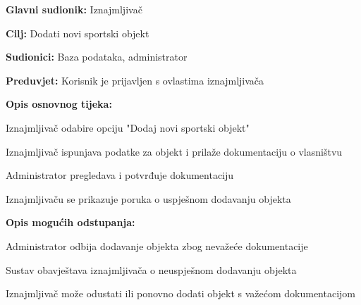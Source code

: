 					\noindent {}
					\begin{packed_item}
						
						\item \textbf{Glavni sudionik: } Iznajmljivač
						\item  \textbf{Cilj:} Dodati novi sportski objekt
						\item  \textbf{Sudionici:} Baza podataka, administrator
						\item  \textbf{Preduvjet:} Korisnik je prijavljen s ovlastima iznajmljivača 
						\item  \textbf{Opis osnovnog tijeka:}
						
						\item[] \begin{packed_enum}
							
							\item Iznajmljivač odabire opciju "Dodaj novi sportski objekt"
							\item Iznajmljivač ispunjava podatke za objekt i prilaže dokumentaciju o vlasništvu
							\item Administrator pregledava i potvrđuje dokumentaciju
							\item Iznajmljivaču se prikazuje poruka o uspješnom dodavanju objekta
							
						\end{packed_enum}
						
						\item  \textbf{Opis mogućih odstupanja:}
						
						\item[] \begin{packed_item}
							
							\item[3.a] Administrator odbija dodavanje objekta zbog nevažeće dokumentacije
							\item[] \begin{packed_enum}
								
								\item Sustav obavještava iznajmljivača o neuspješnom dodavanju objekta
								\item Iznajmljivač može odustati ili ponovno dodati objekt s važećom dokumentacijom
								
							\end{packed_enum}
							
						\end{packed_item}
					
					\end{packed_item}
				
